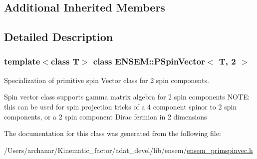 \subsection*{Additional Inherited Members}


\subsection{Detailed Description}
\subsubsection*{template$<$class T$>$\newline
class E\+N\+S\+E\+M\+::\+P\+Spin\+Vector$<$ T, 2 $>$}

Specialization of primitive spin Vector class for 2 spin components. 

Spin vector class supports gamma matrix algebra for 2 spin components N\+O\+TE\+: this can be used for spin projection tricks of a 4 component spinor to 2 spin components, or a 2 spin component Dirac fermion in 2 dimensions 

The documentation for this class was generated from the following file\+:\begin{DoxyCompactItemize}
\item 
/\+Users/archanar/\+Kinematic\+\_\+factor/adat\+\_\+devel/lib/ensem/\mbox{\hyperlink{lib_2ensem_2ensem__primspinvec_8h}{ensem\+\_\+primspinvec.\+h}}\end{DoxyCompactItemize}
